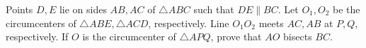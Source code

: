 Points $D,E$ lie on sides $AB,AC$ of $\triangle{ABC}$ such that $DE\parallel BC$. Let $O_1,O_2$ be the circumcenters of $\triangle{ABE},\triangle{ACD}$, respectively. Line $O_1O_2$ meets $AC,AB$ at $P,Q$, respectively. If $O$ is the circumcenter of $\triangle{APQ}$, prove that $AO$ bisects $BC$.